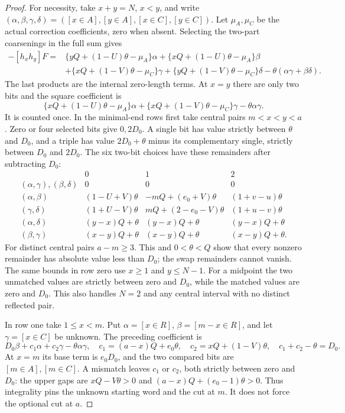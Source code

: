 \documentclass[11pt,a4paper]{amsart}
\numberwithin{equation}{section}
\theoremstyle{plain}
\theoremstyle{definition}
\begin{document}
\begin{proof}
For necessity, take \(x+y=N\), \(x<y\), and write
\((\alpha,\beta,\gamma,\delta)=([x\in A],[y\in A],[x\in C],[y\in C])\).
Let \(\mu_A,\mu_C\) be the actual correction coefficients, zero when absent.
Selecting the two-part coarsenings in the full sum gives
\begin{align*}
 -[h_xh_y]F={}&\{yQ+(1-U)\theta-\mu_A\}\alpha
 +\{xQ+(1-U)\theta-\mu_A\}\beta\\
 &+\{xQ+(1-V)\theta-\mu_C\}\gamma
 +\{yQ+(1-V)\theta-\mu_C\}\delta
 -\theta(\alpha\gamma+\beta\delta).
\end{align*}
The last products are the internal zero-length terms.  At \(x=y\) there
are only two bits and the square coefficient is
\[
 \{xQ+(1-U)\theta-\mu_A\}\alpha
 +\{xQ+(1-V)\theta-\mu_C\}\gamma-\theta\alpha\gamma.
\]
It is counted once.  In the minimal-end rows first take central pairs
\(m<x<y<a\).  Zero or four selected bits give \(0,2D_0\).
A single bit has value strictly between \(\theta\) and \(D_0\), and a triple
has value \(2D_0+\theta\) minus its complementary single, strictly between
\(D_0\) and \(2D_0\).  The six two-bit choices have these remainders after
subtracting \(D_0\):
\[
\begin{array}{c|ccc}
 &0&1&2\\\hline
(\alpha,\gamma),(\beta,\delta)&0&0&0\\
(\alpha,\beta)&(1-U+V)\theta&-mQ+(e_0+V)\theta&(1+v-u)\theta\\
(\gamma,\delta)&(1+U-V)\theta&mQ+(2-e_0-V)\theta&(1+u-v)\theta\\
(\alpha,\delta)&(y-x)Q+\theta&(y-x)Q+\theta&(y-x)Q+\theta\\
(\beta,\gamma)&(x-y)Q+\theta&(x-y)Q+\theta&(x-y)Q+\theta.
\end{array}
\]
For distinct central pairs \(a-m\ge3\).  This and \(0<\theta<Q\) show that
every nonzero remainder has absolute value less than \(D_0\); the swap
remainders cannot vanish.  The same bounds in row zero use \(x\ge1\) and
\(y\le N-1\).  For a midpoint the two unmatched values are strictly between
zero and \(D_0\), while the matched values are zero and \(D_0\).  This also
handles \(N=2\) and any central interval with no distinct reflected pair.

In row one take \(1\le x<m\).  Put
\(\alpha=[x\in R]\), \(\beta=[m-x\in R]\), and let \(\gamma=[x\in C]\)
be unknown.  The preceding coefficient is
\[
 D_0\beta+c_1\alpha+c_2\gamma-\theta\alpha\gamma,
 \quad c_1=(a-x)Q+e_0\theta,\quad c_2=xQ+(1-V)\theta,
 \quad c_1+c_2-\theta=D_0.
\]
At \(x=m\) its base term is \(e_0D_0\), and the two compared bits are
\([m\in A],[m\in C]\).  A mismatch leaves \(c_1\) or \(c_2\), both strictly
between zero and \(D_0\): the upper gaps are
\(xQ-V\theta>0\) and \((a-x)Q+(e_0-1)\theta>0\).
Thus integrality pins the unknown starting word and the cut at \(m\).
It does not force the optional cut at \(a\).


\end{proof}
\end{document}
